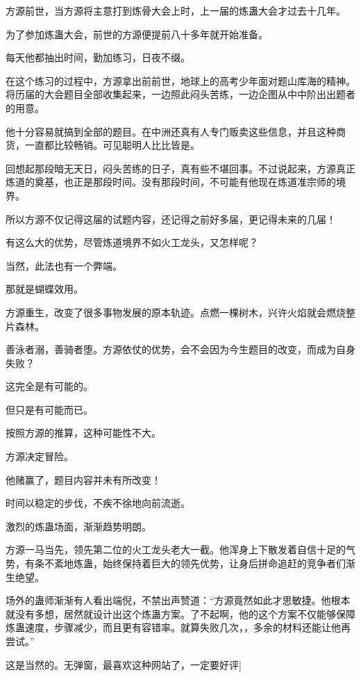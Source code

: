 
\begin{this_body}

方源前世，当方源将主意打到炼骨大会上时，上一届的炼蛊大会才过去十几年。

为了参加炼蛊大会，前世的方源便提前八十多年就开始准备。

每天他都抽出时间，勤加练习，日夜不缀。

在这个练习的过程中，方源拿出前前世，地球上的高考少年面对题山库海的精神。将历届的大会题目全部收集起来，一边照此闷头苦练，一边企图从中中阶出出题者的用意。

他十分容易就搞到全部的题目。在中洲还真有人专门贩卖这些信息，并且这种商货，一直都比较畅销。可见聪明人比比皆是。

回想起那段暗无天日，闷头苦练的日子，真有些不堪回事。不过说起来，方源真正炼道的奠基，也正是那段时间。没有那段时间，不可能有他现在炼道准宗师的境界。

所以方源不仅记得这届的试题内容，还记得之前好多届，更记得未来的几届！

有这么大的优势，尽管炼道境界不如火工龙头，又怎样呢？

当然，此法也有一个弊端。

那就是蝴蝶效用。

方源重生，改变了很多事物发展的原本轨迹。点燃一棵树木，兴许火焰就会燃烧整片森林。

善泳者溺，善骑者堕。方源依仗的优势，会不会因为今生题目的改变，而成为自身失败？

这完全是有可能的。

但只是有可能而已。

按照方源的推算，这种可能性不大。

方源决定冒险。

他赌赢了，题目内容并未有所改变！

时间以稳定的步伐，不疾不徐地向前流逝。

激烈的炼蛊场面，渐渐趋势明朗。

方源一马当先，领先第二位的火工龙头老大一截。他浑身上下散发着自信十足的气势，有条不紊地炼蛊，始终保持着巨大的领先优势，让身后拼命追赶的竞争者们渐生绝望。

场外的蛊师渐渐有人看出端倪，不禁出声赞道：“方源竟然如此才思敏捷。他根本就没有多想，居然就设计出这个炼蛊方案。了不起啊，他的这个方案不仅能够保障炼蛊速度，步骤减少，而且更有容错率。就算失败几次，，多余的材料还能让他再尝试。”

这是当然的。无弹窗，最喜欢这种网站了，一定要好评]


\end{this_body}
